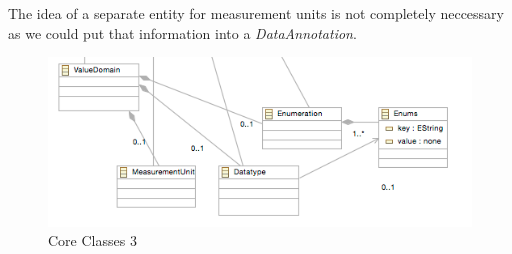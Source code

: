 \documentclass{article}
\begin{document}
The idea of a separate entity for measurement units is not completely neccessary as we could put that information into a \emph{DataAnnotation}.


\begin{figure}[here]
\includegraphics[scale=0.4]{images/core3}
\caption{Core Classes 3} 
\label{fig:core3}
\end{figure}
\end{document}
